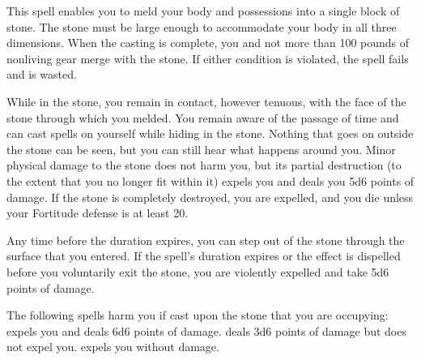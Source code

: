 \spelldur{\durlong}
\begin{spelleffect}
  This spell enables you to meld your body and possessions into a single block of stone. The stone must be large enough to accommodate your body in all three dimensions. When the casting is complete, you and not more than 100 pounds of nonliving gear merge with the stone. If either condition is violated, the spell fails and is wasted.
  \par While in the stone, you remain in contact, however tenuous, with the face of the stone through which you melded. You remain aware of the passage of time and can cast spells on yourself while hiding in the stone. Nothing that goes on outside the stone can be seen, but you can still hear what happens around you. Minor physical damage to the stone does not harm you, but its partial destruction (to the extent that you no longer fit within it) expels you and deals you 5d6 points of damage. If the stone is completely destroyed, you are expelled, and you die unless your Fortitude defense is at least 20.
  \par Any time before the duration expires, you can step out of the stone through the surface that you entered. If the spell's duration expires or the effect is dispelled before you voluntarily exit the stone, you are violently expelled and take 5d6 points of damage.
\end{spelleffect}
\begin{spellnotes}
  The following spells harm you if cast upon the stone that you are occupying:  expels you and deals 6d6 points of damage.  deals 3d6 points of damage but does not expel you.  expels you without damage.
\end{spellnotes}

